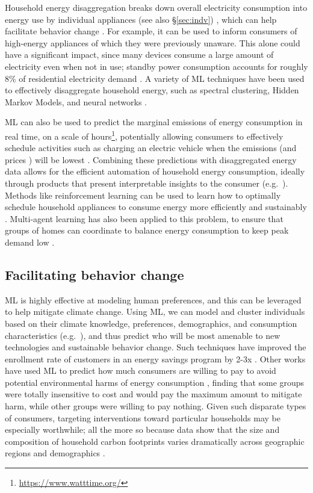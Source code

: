 \documentclass[11pt]{report}
\newcommand{\Gap}{\texorpdfstring{\hfill}{}}
\newcommand{\Rec}{\texorpdfstring{{\small\emph{\color{blue}{\fbox{High Leverage}}}}}{}}
\begin{document}
Household energy disaggregation breaks down overall electricity consumption into energy use by individual appliances (see also \S\ref{sec:indv}) \cite{armel2013disaggregation}, which can help facilitate behavior change \cite{sundramoorthy2011domesticating}. For example, it can be used to inform consumers of high-energy appliances of which they were previously unaware. This alone could have a significant impact, since many devices consume a large amount of electricity even when not in use; standby power consumption accounts for roughly 8\% of residential electricity demand \cite{mackay2008sustainable}. A variety of ML techniques have been used to effectively disaggregate household energy, such as spectral clustering, Hidden Markov Models, and neural networks  \cite{armel2013disaggregation}.

ML can also be used to predict the marginal emissions of energy consumption in real time, on a scale of hours\footnote{\url{https://www.watttime.org/}}, potentially allowing consumers to effectively schedule activities such as charging an electric vehicle when the emissions (and prices \cite{klenert2018making}) will be lowest
\cite{olivierElectricitymap}. Combining these predictions with disaggregated energy data allows for the efficient automation of household energy consumption, ideally through products that present interpretable insights to the consumer (e.g.~\cite{strbac2008demand, schweppe1989algorithms}). Methods like reinforcement learning can be used to learn how to optimally schedule household appliances to consume energy more efficiently and sustainably \cite{mocanu2018line, remani2018residential}. Multi-agent learning has also been applied to this problem, to ensure that groups of homes can coordinate to balance energy consumption to keep peak demand low \cite{ramchurn2011agent2, ygge1999homebots}.

\subsection{Facilitating behavior change \Gap \Rec}
\label{sec:behavior_change}
ML is highly effective at modeling human preferences, and this can be leveraged to help mitigate climate change. Using ML, we can model and cluster individuals based on their climate knowledge, preferences, demographics, and consumption characteristics (e.g.~\cite{beiser2018assessing,carr2011exploring,de2018graph,gabe2016householders,yang2013review}), and thus predict who will be most amenable to new technologies and sustainable behavior change. Such techniques have improved the enrollment rate of customers in an energy savings program by 2-3x \cite{albert2016predictive}. Other works have used ML to predict how much consumers are willing to pay to avoid potential environmental harms of energy consumption \cite{de2013willingness}, finding that some groups were totally insensitive to cost and would pay the maximum amount to mitigate harm, while other groups were willing to pay nothing. Given such disparate types of consumers, targeting interventions toward particular households may be especially worthwhile; all the more so because data show that the size and composition of household carbon footprints varies dramatically across geographic regions and demographics \cite{jones2011quantifying}.
\end{document}
